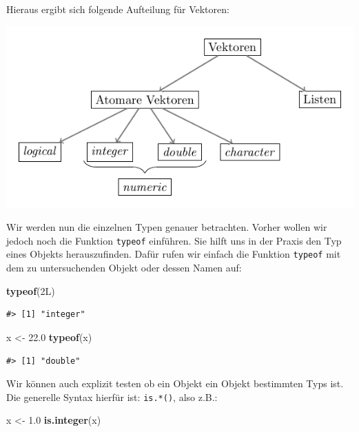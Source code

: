 \documentclass[]{book}
\newenvironment{Shaded}{\begin{snugshade}}{\end{snugshade}}
\newcommand{\KeywordTok}[1]{\textcolor[rgb]{0.13,0.29,0.53}{\textbf{#1}}}
\newcommand{\FloatTok}[1]{\textcolor[rgb]{0.00,0.00,0.81}{#1}}
\newcommand{\StringTok}[1]{\textcolor[rgb]{0.31,0.60,0.02}{#1}}
\newcommand{\NormalTok}[1]{#1}
\begin{document}
Hieraus ergibt sich folgende Aufteilung für Vektoren:

\begin{center}\includegraphics[width=0.8\linewidth]{figures/vector-classification} \end{center}

Wir werden nun die einzelnen Typen genauer betrachten. Vorher wollen wir
jedoch noch die Funktion \texttt{typeof} einführen. Sie hilft uns in der
Praxis den Typ eines Objekts herauszufinden. Dafür rufen wir einfach die
Funktion \texttt{typeof} mit dem zu untersuchenden Objekt oder dessen
Namen auf:

\begin{Shaded}
\begin{Highlighting}[]
\KeywordTok{typeof}\NormalTok{(2L)}
\end{Highlighting}
\end{Shaded}

\begin{verbatim}
#> [1] "integer"
\end{verbatim}

\begin{Shaded}
\begin{Highlighting}[]
\NormalTok{x <-}\StringTok{ }\FloatTok{22.0}
\KeywordTok{typeof}\NormalTok{(x)}
\end{Highlighting}
\end{Shaded}

\begin{verbatim}
#> [1] "double"
\end{verbatim}

Wir können auch explizit testen ob ein Objekt ein Objekt bestimmten Typs
ist. Die generelle Syntax hierfür ist: \texttt{is.*()}, also z.B.:

\begin{Shaded}
\begin{Highlighting}[]
\NormalTok{x <-}\StringTok{ }\FloatTok{1.0}
\KeywordTok{is.integer}\NormalTok{(x)}
\end{Highlighting}
\end{Shaded}
\end{document}
